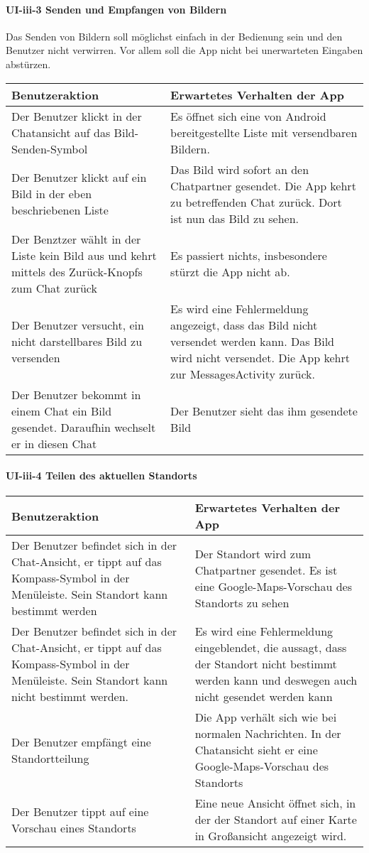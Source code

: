 \paragraph{UI-iii-3 Senden und Empfangen von Bildern}

Das Senden von Bildern soll möglichst einfach in der Bedienung sein und den Benutzer nicht verwirren. Vor allem soll die App nicht bei unerwarteten Eingaben abstürzen.

\begin{longtable}{|p{8cm}|p{8.5cm}|}
\hline
Benutzeraktion & Erwartetes Verhalten der App\tabularnewline
\hline

Der Benutzer klickt in der Chatansicht auf das Bild-Senden-Symbol & Es
öffnet sich eine von Android bereitgestellte Liste mit versendbaren
Bildern.\tabularnewline
Der Benutzer klickt auf ein Bild in der eben beschriebenen Liste & Das
Bild wird sofort an den Chatpartner gesendet. Die App kehrt zu
betreffenden Chat zurück. Dort ist nun das Bild zu sehen.\tabularnewline
Der Benztzer wählt in der Liste kein Bild aus und kehrt mittels des
Zurück-Knopfs zum Chat zurück & Es passiert nichts, insbesondere stürzt
die App nicht ab.\tabularnewline
Der Benutzer versucht, ein nicht darstellbares Bild zu versenden & Es
wird eine Fehlermeldung angezeigt, dass das Bild nicht versendet werden
kann. Das Bild wird nicht versendet. Die App kehrt zur MessagesActivity
zurück.\tabularnewline
Der Benutzer bekommt in einem Chat ein Bild gesendet. Daraufhin wechselt
er in diesen Chat & Der Benutzer sieht das ihm gesendete
Bild\tabularnewline
\hline
\end{longtable}

\paragraph{UI-iii-4 Teilen des aktuellen Standorts}

\begin{longtable}{|p{8cm}|p{8.5cm}|}
\hline
Benutzeraktion & Erwartetes Verhalten der App\tabularnewline
\hline

Der Benutzer befindet sich in der Chat-Ansicht, er tippt auf das
Kompass-Symbol in der Menüleiste. Sein Standort kann bestimmt werden &
Der Standort wird zum Chatpartner gesendet. Es ist eine
Google-Maps-Vorschau des Standorts zu sehen\tabularnewline
Der Benutzer befindet sich in der Chat-Ansicht, er tippt auf das
Kompass-Symbol in der Menüleiste. Sein Standort kann nicht bestimmt
werden. & Es wird eine Fehlermeldung eingeblendet, die aussagt, dass der
Standort nicht bestimmt werden kann und deswegen auch nicht gesendet
werden kann\tabularnewline
Der Benutzer empfängt eine Standortteilung & Die App verhält sich wie
bei normalen Nachrichten. In der Chatansicht sieht er eine
Google-Maps-Vorschau des Standorts\tabularnewline
Der Benutzer tippt auf eine Vorschau eines Standorts & Eine neue Ansicht
öffnet sich, in der der Standort auf einer Karte in Großansicht
angezeigt wird.\tabularnewline
\hline
\end{longtable}



